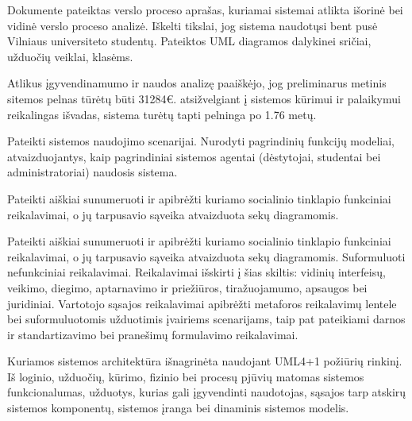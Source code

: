 \documentclass{VUMIFPSkursinis}
\begin{document}
Dokumente pateiktas verslo proceso aprašas, kuriamai sistemai atlikta išorinė bei vidinė verslo proceso analizė. Iškelti tikslai, jog sistema naudotųsi bent pusė Vilniaus universiteto studentų. Pateiktos UML diagramos dalykinei sričiai, užduočių veiklai, klasėms.

Atlikus įgyvendinamumo ir naudos analizę paaiškėjo, jog preliminarus metinis sitemos pelnas tūrėtų būti 31284€. atsižvelgiant į sistemos kūrimui ir palaikymui reikalingas išvadas, sistema turėtų tapti pelninga po 1.76 metų.

Pateikti sistemos naudojimo scenarijai. Nurodyti pagrindinių funkcijų modeliai, atvaizduojantys, kaip pagrindiniai sistemos agentai (dėstytojai, studentai bei  administratoriai) naudosis sistema.

Pateikti aiškiai sunumeruoti ir apibrėžti kuriamo socialinio tinklapio funkciniai reikalavimai, o
jų tarpusavio sąveika atvaizduota sekų diagramomis.

Pateikti aiškiai sunumeruoti ir apibrėžti kuriamo socialinio tinklapio funkciniai reikalavimai, o
jų tarpusavio sąveika atvaizduota sekų diagramomis.
Suformuluoti nefunkciniai reikalavimai. Reikalavimai išskirti į šias skiltis: vidinių interfeisų,
veikimo, diegimo, aptarnavimo ir priežiūros, tiražuojamumo, apsaugos bei juridiniai.
Vartotojo sąsajos reikalavimai apibrėžti metaforos reikalavimų lentele bei suformuluotomis užduotimis
įvairiems scenarijams, taip pat pateikiami darnos ir standartizavimo bei pranešimų formulavimo
reikalavimai.

Kuriamos sistemos architektūra išnagrinėta naudojant UML4+1 požiūrių rinkinį. Iš loginio, užduočių, kūrimo, fizinio bei procesų pjūvių matomas sistemos funkcionalumas, užduotys, kurias gali įgyvendinti naudotojas, sąsajos tarp atskirų sistemos komponentų, sistemos įranga bei dinaminis sistemos modelis.
\end{document}
